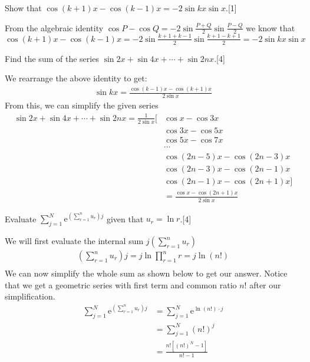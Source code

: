 \documentclass[12pt, a4 paper]{article}
\begin{document}
\begin{outline}[enumerate]
 \1
 \2 Show that \(\cos{(k+1)}x-\cos{(k-1)x}=-2\sin{kx}\sin{x}\).\hfill[1]
\begin{answer}
  From the algebraic identity \(\cos P - \cos Q = -2\sin\frac{P+Q}{2}\sin\frac{P-Q}{2}\) we know that \(\cos{(k+1)}x-\cos{(k-1)x} = -2\sin\frac{k+1+k-1}{2}\sin\frac{k+1-k+1}{2} = -2\sin{kx}\sin x\)
\end{answer}
 \2 Find the sum of the series \(\sin{2x}+\sin{4x}+\cdots+\sin{2nx}\).\hfill[4]%
 \begin{answer}
   We rearrange the above identity to get:
   \begin{align*}
     \sin{kx} = \frac{\cos{(k-1)x}-\cos{(k+1)x}}{2\sin x}
   \end{align*}
   From this, we can simplify the given series
   \begin{align*}
     \sin{2x}+\sin{4x}+\cdots+\sin{2nx} = \frac{1}{2\sin x}[& \cos x - \cos 3x \\
     & \cos 3x - \cos 5x \\
     & \cos5x - \cos 7x \\
     & \cdots \\
     & \cos{(2n-5)x} - \cos{(2n-3)x} \\
     & \cos{(2n-3)x} - \cos{(2n-1)x} \\
     & \cos{(2n-1)x} - \cos{(2n+1)x}] \\
     &= \frac{\cos x - \cos{(2n+1)x}}{2\sin x}
   \end{align*}
 \end{answer}

 \1 Evaluate \(\sum\limits_{j=1}^{N}\mathrm{e}^{\left(\sum\limits_{r=1}^{n}u_{r}\right)j}\) given that \(u_{r}=\ln{r}\).\hfill[4]%
 \begin{answer}
  We will first evaluate the internal sum \(j\left(\sum\limits_{r=1}^{n}u_{r}\right)\)
  \begin{align*}
   (\sum\limits_{r=1}^{n}u_{r})j= j\ln\prod_{r=1}^n r = j\ln{(n!)} \\
  \end{align*}
  We can now simplify the whole sum as shown below to get our answer. Notice that we get a geometric series with first term and common ratio \(n! \) after our simplification.
  \begin{align*}
   \sum\limits_{j=1}^{N}\mathrm{e}^{\left(\sum\limits_{r=1}^{n}u_{r}\right)j} & =      \sum\limits_{j=1}^{N}\mathrm{e}^{\ln(n!) \cdot j} \\
                                                                              & = \sum\limits_{j=1}^{N}{(n!)}^j                          \\
                                                                              & = \frac{n![{(n!)}^N-1]}{n!-1}
  \end{align*}
 \end{answer}
\end{outline}
\end{document}

